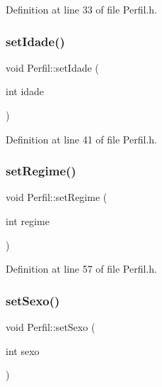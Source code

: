 Definition at line 33 of file Perfil.\+h.

\hypertarget{class_perfil_a2ba0e4d30dab55c5ef3ab1dbfcb6f95f}{}\label{class_perfil_a2ba0e4d30dab55c5ef3ab1dbfcb6f95f} 
\subsubsection{\texorpdfstring{set\+Idade()}{setIdade()}}
{\footnotesize\ttfamily void Perfil\+::set\+Idade (\begin{DoxyParamCaption}\item[{int}]{idade }\end{DoxyParamCaption})\hspace{0.3cm}{\ttfamily [inline]}}



Definition at line 41 of file Perfil.\+h.

\hypertarget{class_perfil_ab292bc51eb2c229dabb79ca5788d2f61}{}\label{class_perfil_ab292bc51eb2c229dabb79ca5788d2f61} 
\subsubsection{\texorpdfstring{set\+Regime()}{setRegime()}}
{\footnotesize\ttfamily void Perfil\+::set\+Regime (\begin{DoxyParamCaption}\item[{int}]{regime }\end{DoxyParamCaption})\hspace{0.3cm}{\ttfamily [inline]}}



Definition at line 57 of file Perfil.\+h.

\hypertarget{class_perfil_ab9b481a1fc16ab6534e450b34e5f61fc}{}\label{class_perfil_ab9b481a1fc16ab6534e450b34e5f61fc} 
\subsubsection{\texorpdfstring{set\+Sexo()}{setSexo()}}
{\footnotesize\ttfamily void Perfil\+::set\+Sexo (\begin{DoxyParamCaption}\item[{int}]{sexo }\end{DoxyParamCaption})\hspace{0.3cm}{\ttfamily [inline]}}



